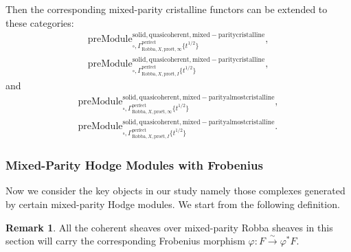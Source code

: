 \documentclass[12pt]{book}
\theoremstyle{definition}
\newtheorem{remark}{Remark}
\begin{document}
\indent Then the corresponding mixed-parity cristalline functors can be extended to these categories:
\begin{align}
\mathrm{preModule}^\mathrm{solid,quasicoherent,mixed-paritycristalline}_{\square,\Gamma^\mathrm{perfect}_{\text{Robba},X,\text{pro\'et},\infty}\{t^{1/2}\}},\\
\mathrm{preModule}^\mathrm{solid,quasicoherent,mixed-paritycristalline}_{\square,\Gamma^\mathrm{perfect}_{\text{Robba},X,\text{pro\'et},I}\{t^{1/2}\}}, 
\end{align}
and
\begin{align}
\mathrm{preModule}^\mathrm{solid,quasicoherent,mixed-parityalmostcristalline}_{\square,\Gamma^\mathrm{perfect}_{\text{Robba},X,\text{pro\'et},\infty}\{t^{1/2}\}},\\
\mathrm{preModule}^\mathrm{solid,quasicoherent,mixed-parityalmostcristalline}_{\square,\Gamma^\mathrm{perfect}_{\text{Robba},X,\text{pro\'et},I}\{t^{1/2}\}}. 
\end{align}



\subsubsection{Mixed-Parity Hodge Modules with Frobenius}


\noindent Now we consider the key objects in our study namely those complexes generated by certain mixed-parity Hodge modules. We start from the following definition.

\begin{remark}
All the coherent sheaves over mixed-parity Robba sheaves in this section will carry the corresponding Frobenius morphism $\varphi: F \overset{\sim}{\longrightarrow} \varphi^*F$.
\end{remark}
\end{document}
